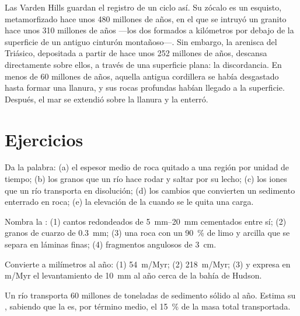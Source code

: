 Las Varden Hills guardan el registro de un ciclo así. Su zócalo es un
esquisto, metamorfizado hace unos 480 millones de años, en el que se intruyó
un granito hace unos 310 millones de años ---los dos formados a kilómetros por
debajo de la superficie de un antiguo cinturón montañoso---. Sin embargo, la
arenisca del Triásico, depositada a partir de hace unos 252 millones de años,
descansa directamente sobre ellos, a través de una superficie plana: la
discordancia. En menos de 60 millones de años, aquella antigua cordillera se
había desgastado hasta formar una llanura, y sus rocas profundas habían
llegado a la superficie. Después, el mar se extendió sobre la llanura y la
enterró.

\section{Ejercicios}

\begin{exercise}[$\star$]\label{exo:g12:destruction-of-mountains:1}
Da la palabra: (a) el espesor medio de roca quitado a una región por unidad de
tiempo; (b) los granos que un río hace rodar y saltar por su lecho; (c) los
iones que un río transporta en disolución; (d) los cambios que convierten un
sedimento enterrado en roca; (e) la elevación de la  cuando se le
quita una carga.
\end{exercise}

\begin{exercise}[$\star$]\label{exo:g12:destruction-of-mountains:2}
Nombra la : (1) cantos redondeados de \qtyrange{5}{20}{mm}
cementados entre sí; (2) granos de cuarzo de \qty{0.3}{mm}; (3) una roca con
un \qty{90}{\percent} de limo y arcilla que se separa en láminas finas;
(4) fragmentos angulosos de \qty{3}{cm}.
\end{exercise}

\begin{exercise}[$\star$]\label{exo:g12:destruction-of-mountains:3}
Convierte a milímetros al año: (1) \qty{54}{m/Myr}; (2) \qty{218}{m/Myr};
(3) y expresa en \unit{m/Myr} el levantamiento de \qty{10}{mm} al año cerca de la bahía de Hudson.
\end{exercise}

\begin{exercise}[$\star$]\label{exo:g12:destruction-of-mountains:4}
Un río transporta 60 millones de toneladas de sedimento sólido al año. Estima
su , sabiendo que la  es, por término medio, el
\qty{15}{\percent} de la masa total transportada.
\end{exercise}

